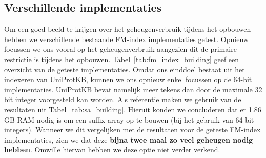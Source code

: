 \subsection{Verschillende implementaties}\label{subsec:verschillende-implementaties}
Om een goed beeld te krijgen over het geheugenverbruik tijdens het opbouwen hebben we verschillende bestaande FM-index implementaties getest.
Opnieuw focussen we ons vooral op het geheugenverbruik aangezien dit de primaire restrictie is tijdens het opbouwen.
Tabel~\ref{tab:fm_index_building} geef een overzicht van de geteste implementaties.
Omdat ons einddoel bestaat uit het indexeren van UniProtKB, kunnen we ons opnieuw enkel focussen op de 64-bit implementaties.
UniProtKB bevat namelijk meer tekens dan door de maximale 32 bit integer voorgesteld kan worden.
Als referentie maken we gebruik van de resultaten uit Tabel~\ref{tab:sa_building}.
Hieruit konden we concluderen dat er 1.86 GB RAM nodig is om een suffix array op te bouwen (bij het gebruik van 64-bit integers).
Wanneer we dit vergelijken met de resultaten voor de geteste FM-index implementaties, zien we dat deze \textbf{bijna twee maal zo veel geheugen nodig hebben}.
Omwille hiervan hebben we deze optie niet verder verkend.

\begin{table}[H]
    \begin{minipage}{\linewidth}
        \centering
        \caption{Uitvoeringstijd en maximaal geheugengebruik voor het opbouwen van een FM-index aan de hand van verschillende implementaties voor de Swiss-Prot eiwitdatabank.
        Afhankelijk van de gebruikte implementatie (32- of 64-bit) is een andere kolom ingevuld.
        Een - staat voor niet getest. Deze testen werden lokaal uitgevoerd op een M1 Pro MacBook Pro.
        De specificaties hiervan zijn terug te vinden in tabel~\ref{tab:macbook_hardware}.}
        \label{tab:fm_index_building}
    \end{minipage}
\end{table}


